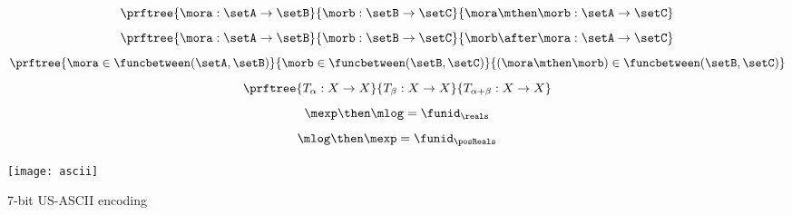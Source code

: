 {\begin{forslides}
\begin{equation}\label{eq:funccomp1}
\prftree{\mora : \setA \to \setB}{\morb : \setB \to \setC}{\mora \mthen \morb : \setA \to \setC}
\end{equation}
\begin{equation}\label{eq:funccomp2}
\prftree{\mora : \setA \to \setB}{\morb : \setB \to \setC}{\morb \after \mora : \setA \to \setC}
\end{equation}
\begin{equation}\label{eq:funccomp3}
\prftree{\mora \in \funcbetween(\setA, \setB)}{%
\morb \in \funcbetween( \setB, \setC)}{ (\mora \mthen \morb) \in \funcbetween( \setB, \setC)}
\end{equation}
\begin{equation}\label{eq:transitions}
\prftree{T_\alpha:  X \to X }{T_\beta : X \to X}{T_{\alpha+\beta} : X \to X}
\end{equation}
\begin{equation}\label{eq:explogid}
\mexp \then \mlog = \funid_{\reals}
\end{equation}
\begin{equation}\label{eq:logexpid}
\mlog \then \mexp = \funid_{\posReals}
\end{equation}
\end{forslides}
}%

\begin{marginfigure}
\texttt{[image: ascii]}
\caption{7-bit US-ASCII encoding }
\label{fig:ascii}
\end{marginfigure}

